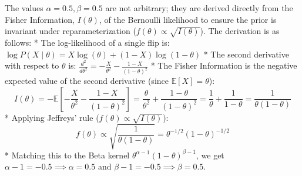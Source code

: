 \documentclass[
  letterpaper,
  DIV=11,
  numbers=noendperiod]{scrartcl}
\begin{document}
The values \(\alpha=0.5, \beta=0.5\) are not arbitrary; they are derived
directly from the Fisher Information, \(I(\theta)\), of the Bernoulli
likelihood to ensure the prior is invariant under reparameterization
(\(f(\theta) \propto \sqrt{I(\theta)}\)). The derivation is as follows:
* The log-likelihood of a single flip is:
\(\log P(X \mid \theta) = X \log(\theta) + (1 - X) \log(1 - \theta)\) *
The second derivative with respect to \(\theta\) is:
\(\frac{d^2}{d\theta^2} = -\frac{X}{\theta^2} - \frac{1 - X}{(1 - \theta)^2}\)
* The Fisher Information is the negative expected value of the second
derivative (since \(\mathbb{E}[X] = \theta\)): \[
I(\theta) = -\mathbb{E} \left[ -\frac{X}{\theta^2} - \frac{1 - X}{(1 - \theta)^2} \right] = \frac{\theta}{\theta^2} + \frac{1 - \theta}{(1 - \theta)^2} = \frac{1}{\theta} + \frac{1}{1 - \theta} = \frac{1}{\theta(1 - \theta)}
\] * Applying Jeffreys' rule (\(f(\theta) \propto \sqrt{I(\theta)}\)):
\[
f(\theta) \propto \sqrt{\frac{1}{\theta(1 - \theta)}} = \theta^{-1/2} (1 - \theta)^{-1/2}
\] * Matching this to the Beta kernel
\(\theta^{\alpha - 1} (1 - \theta)^{\beta - 1}\), we get
\(\alpha - 1 = -0.5 \implies \alpha = 0.5\) and
\(\beta - 1 = -0.5 \implies \beta = 0.5\).
\end{document}

